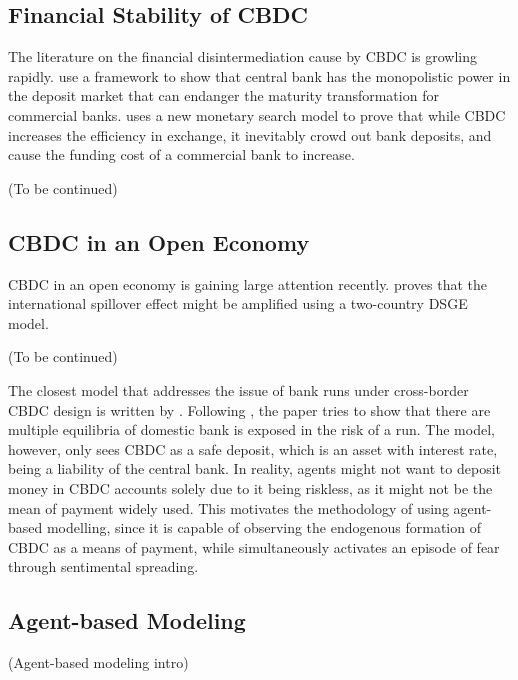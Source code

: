 \subsection{Financial Stability of CBDC}

The literature on the financial disintermediation cause by CBDC is growling rapidly.
\citet*{FVSSU21} use a \citet*{DD83} framework to show that central bank has the
monopolistic power in the deposit market that can endanger the maturity
transformation for commercial banks.
\citet*{Keister19} uses a new monetary search model to prove that while CBDC
increases the efficiency in exchange, it inevitably crowd out bank deposits, and
cause the funding cost of a commercial bank to increase.

\begin{center}
(To be continued)
\end{center}

\subsection{CBDC in an Open Economy}
CBDC in an open economy is gaining large attention recently. \citet*{FMS22}
proves that the international spillover effect might be amplified using a
two-country DSGE model.

\begin{center}
(To be continued)
\end{center}

The closest model that addresses the issue of bank runs under cross-border CBDC
design is written by \citet{Popescu22}. Following \citet*{DD83}, the paper tries
to show that there are multiple equilibria of domestic bank is exposed in the
risk of a run. The model, however, only sees CBDC as a safe deposit, which is an
asset with interest rate, being a liability of the central bank. In reality,
agents might not want to deposit money in CBDC accounts solely due to it being
riskless, as it might not be the mean of payment widely used. This motivates the
methodology of using agent-based modelling, since it is capable of observing the
endogenous formation of CBDC as a means of payment, while simultaneously
activates an episode of fear through sentimental spreading.

\subsection{Agent-based Modeling}

\begin{center}
    (Agent-based modeling intro)
\end{center}

